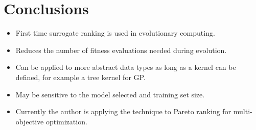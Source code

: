
\section{Conclusions}

\begin{itemize}
\item First time surrogate ranking is used in evolutionary computing.
\item Reduces the number of fitness evaluations needed
  during evolution.
\item Can be applied to more abstract data types as long as a
  kernel can be defined, for example a tree kernel for GP.
\item May be sensitive to the model selected and training set size.
\item Currently the author is applying the technique to Pareto
  ranking for multi-objective optimization.
\end{itemize}
